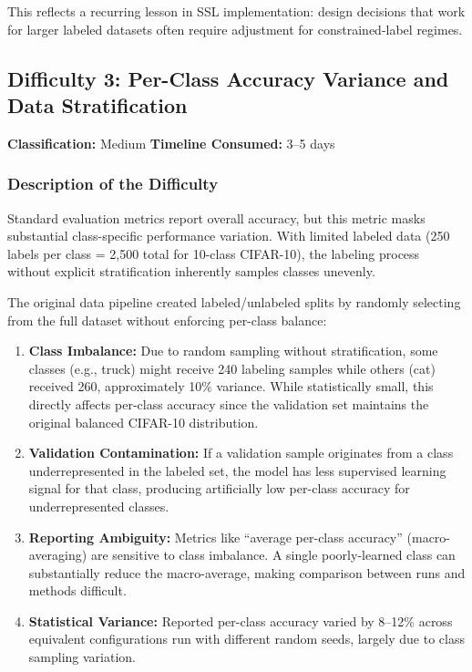 This reflects a recurring lesson in SSL implementation: design decisions that work for larger labeled datasets often require adjustment for constrained-label regimes.

\subsection{Difficulty 3: Per-Class Accuracy Variance and Data Stratification}

\textbf{Classification:} Medium \quad \textbf{Timeline Consumed:} 3--5 days

\subsubsection{Description of the Difficulty}

Standard evaluation metrics report overall accuracy, but this metric masks substantial class-specific performance variation. With limited labeled data (250 labels per class = 2,500 total for 10-class CIFAR-10), the labeling process without explicit stratification inherently samples classes unevenly.

The original data pipeline created labeled/unlabeled splits by randomly selecting from the full dataset without enforcing per-class balance:

\begin{enumerate}
    \item \textbf{Class Imbalance:} Due to random sampling without stratification, some classes (e.g., truck) might receive 240 labeling samples while others (cat) received 260, approximately 10\% variance. While statistically small, this directly affects per-class accuracy since the validation set maintains the original balanced CIFAR-10 distribution.

    \item \textbf{Validation Contamination:} If a validation sample originates from a class underrepresented in the labeled set, the model has less supervised learning signal for that class, producing artificially low per-class accuracy for underrepresented classes.

    \item \textbf{Reporting Ambiguity:} Metrics like ``average per-class accuracy'' (macro-averaging) are sensitive to class imbalance. A single poorly-learned class can substantially reduce the macro-average, making comparison between runs and methods difficult.

    \item \textbf{Statistical Variance:} Reported per-class accuracy varied by 8--12\% across equivalent configurations run with different random seeds, largely due to class sampling variation.
\end{enumerate}

